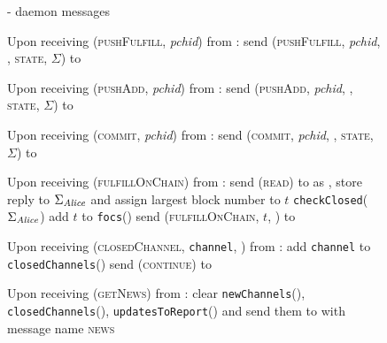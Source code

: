   \begin{figure}[H]
    \begin{systembox}{\fpaynet{} - daemon messages}
      \begin{algorithmic}[1]
        \State Upon receiving (\textsc{pushFulfill}, \textit{pchid}) from
        \alice:
        \Indent
          \State send (\textsc{pushFulfill}, \textit{pchid}, \alice,
          \textsc{state}, $\Sigma$) to \simulator
          \label{alg:fpaynet:daemon:fulfill}
        \EndIndent
        \Statex

        \State Upon receiving (\textsc{pushAdd}, \textit{pchid}) from \alice:
        \Indent
          \State send (\textsc{pushAdd}, \textit{pchid}, \alice, \textsc{state},
          $\Sigma$) to \simulator
          \label{alg:fpaynet:daemon:add}
        \EndIndent
        \Statex

        \State Upon receiving (\textsc{commit}, \textit{pchid}) from \alice:
        \Indent
          \State send (\textsc{commit}, \textit{pchid}, \alice, \textsc{state},
          $\Sigma$) to \simulator
          \label{alg:fpaynet:daemon:commit}
        \EndIndent
        \Statex

        \State Upon receiving (\textsc{fulfillOnChain}) from \alice:
        \Indent
          \State send (\textsc{read}) to \ledger{} as \alice{}, store reply to
          $\Sigma_{\mathit{Alice}}$ and assign largest block number to $t$
          \State \texttt{checkClosed}($\Sigma_{\mathit{Alice}}$)
          \label{alg:fpaynet:daemon:foc:read}
          \State add $t$ to \texttt{focs}(\alice)
          \State send (\textsc{fulfillOnChain}, $t$, \alice) to \simulator
        \EndIndent
        \Statex

        \State Upon receiving (\textsc{closedChannel}, \texttt{channel}, \alice)
        from \simulator:
        \Indent
          \State add \texttt{channel} to \texttt{closedChannels}(\alice)
          \label{alg:fpaynet:closedChannel:report}
          \State send (\textsc{continue}) to \simulator
        \EndIndent
        \Statex

        \State Upon receiving (\textsc{getNews}) from \alice:
        \label{alg:fpaynet:getnews}
        \Indent
          \State clear \texttt{newChannels}(\alice),
          \texttt{closedChannels}(\alice), \texttt{updatesToReport}(\alice) and
          send them to \alice{} with message name \textsc{news}
          \label{alg:fpaynet:getnews:send}
        \EndIndent
      \end{algorithmic}
    \end{systembox}
    \caption{}
    \label{alg:fpaynet:daemon}
  \end{figure}
